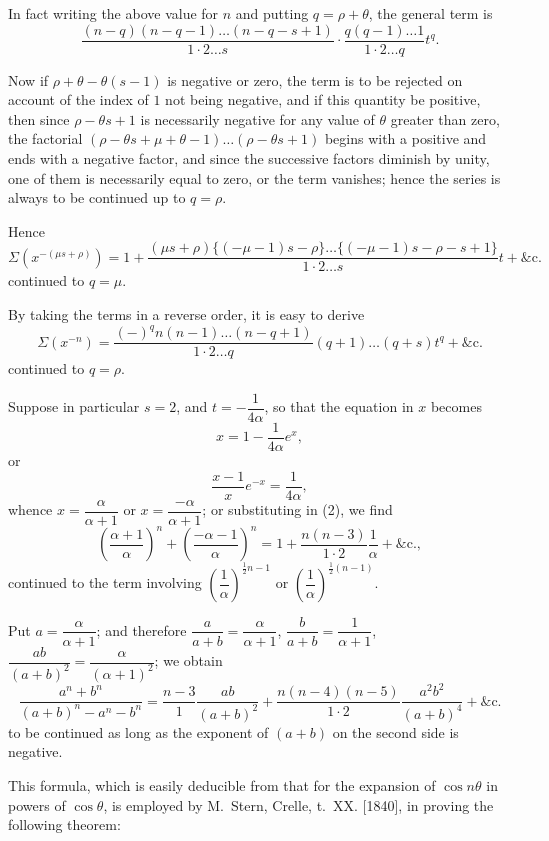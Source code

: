 \documentclass[12pt,a4paper]{article}
\theoremstyle{plain}
\theoremstyle{definition}
\begin{document}
In fact writing the above value for $n$ and putting $q = \rho + \theta$, the general term is
\[
\frac{(n - q)(n - q - 1)\ldots(n - q - s + 1)}{1 \cdot 2 \ldots s} \cdot \frac{q(q - 1)\ldots 1}{1 \cdot 2 \ldots q}t^q.
\]

Now if $\rho + \theta - \theta(s - 1)$ is negative or zero, the term is to be rejected on account of the index of $1$ not being negative, and if this quantity be positive, then since $\rho - \theta s + 1$ is necessarily negative for any value of $\theta$ greater than zero, the factorial $(\rho - \theta s + \mu + \theta - 1)\ldots(\rho - \theta s + 1)$ begins with a positive and ends with a negative factor, and since the successive factors diminish by unity, one of them is necessarily equal to zero, or the term vanishes; hence the series is always to be continued up to $q = \rho$.

Hence
\[
\Sigma(x^{-(\mu s + \rho)}) = 1 + \frac{(\mu s + \rho)\{(-\mu - 1)s - \rho\}\ldots\{(-\mu - 1)s - \rho - s + 1\}}{1 \cdot 2 \ldots s}t + \&\text{c.} \tag{3}
\]
continued to $q = \mu$.

By taking the terms in a reverse order, it is easy to derive
\[
\Sigma(x^{-n}) = \frac{(-)^q n(n - 1)\ldots(n - q + 1)}{1 \cdot 2 \ldots q}(q + 1)\ldots(q + s)t^q + \&\text{c.} \tag{4}
\]
continued to $q = \rho$.

Suppose in particular $s = 2$, and $t = -\dfrac{1}{4\alpha}$, so that the equation in $x$ becomes
\[
x = 1 - \frac{1}{4\alpha}e^x,
\]
or
\[
\frac{x - 1}{x}e^{-x} = \frac{1}{4\alpha},
\]
whence $x = \dfrac{\alpha}{\alpha + 1}$ or $x = \dfrac{-\alpha}{\alpha + 1}$; or substituting in (2), we find
\[
\left(\frac{\alpha + 1}{\alpha}\right)^n + \left(\frac{-\alpha - 1}{\alpha}\right)^n = 1 + \frac{n(n - 3)}{1 \cdot 2}\frac{1}{\alpha} + \&\text{c.},
\]
continued to the term involving $\left(\dfrac{1}{\alpha}\right)^{\frac{1}{2}n - 1}$ or $\left(\dfrac{1}{\alpha}\right)^{\frac{1}{2}(n - 1)}$.

Put $a = \dfrac{\alpha}{\alpha + 1}$; and therefore $\dfrac{a}{a + b} = \dfrac{\alpha}{\alpha + 1}$, $\dfrac{b}{a + b} = \dfrac{1}{\alpha + 1}$, $\dfrac{ab}{(a + b)^2} = \dfrac{\alpha}{(\alpha + 1)^2}$; we obtain
\[
\frac{a^n + b^n}{(a + b)^n - a^n - b^n} = \frac{n - 3}{1}\frac{ab}{(a + b)^2} + \frac{n(n - 4)(n - 5)}{1 \cdot 2}\frac{a^2b^2}{(a + b)^4} + \&\text{c.} \tag{7}
\]
to be continued as long as the exponent of $(a + b)$ on the second side is negative.

\newpage
[187]

This formula, which is easily deducible from that for the expansion of $\cos n\theta$ in powers of $\cos\theta$, is employed by M.\ Stern, Crelle, t.~XX. [1840], in proving the following theorem:
\end{document}
